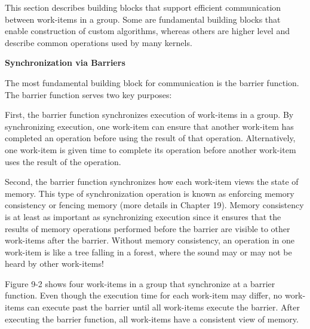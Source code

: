 This section describes building blocks that support efficient communication between work-items in a group. Some are fundamental building blocks that enable construction of custom algorithms, whereas others are higher level and describe common operations used by many kernels.\par

\hspace*{\fill} \par %
\textbf{Synchronization via Barriers}

The most fundamental building block for communication is the barrier function. The barrier function serves two key purposes:\par

First, the barrier function synchronizes execution of work-items in a group. By synchronizing execution, one work-item can ensure that another work-item has completed an operation before using the result of that operation. Alternatively, one work-item is given time to complete its operation before another work-item uses the result of the operation.\par

Second, the barrier function synchronizes how each work-item views the state of memory. This type of synchronization operation is known as enforcing memory consistency or fencing memory (more details in Chapter 19). Memory consistency is at least as important as synchronizing execution since it ensures that the results of memory operations performed before the barrier are visible to other work-items after the barrier. Without memory consistency, an operation in one work-item is like a tree falling in a forest, where the sound may or may not be heard by other work-items!\par

Figure 9-2 shows four work-items in a group that synchronize at a barrier function. Even though the execution time for each work-item may differ, no work-items can execute past the barrier until all work-items execute the barrier. After executing the barrier function, all work-items have a consistent view of memory.\par

